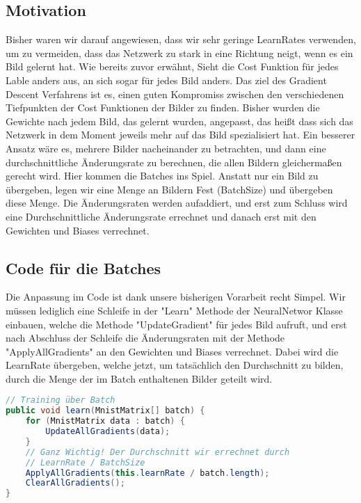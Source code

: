 \documentclass[12pt]{article}
\begin{document}
\subsection{ Motivation}
Bisher waren wir darauf angewiesen, dass wir sehr geringe LearnRates verwenden, um zu vermeiden, dass das Netzwerk zu stark in eine Richtung neigt, wenn es ein Bild gelernt hat. Wie bereits zuvor erwähnt, Sieht die Cost Funktion für jedes Lable anders aus, an sich sogar für jedes Bild anders. Das ziel des Gradient Descent Verfahrens ist es, einen guten Kompromiss zwischen den verschiedenen Tiefpunkten der Cost Funktionen der Bilder zu finden.
Bisher wurden die Gewichte nach jedem Bild, das gelernt wurden, angepasst, das heißt dass sich das Netzwerk in dem Moment jeweils mehr auf das Bild spezialisiert hat. Ein besserer Ansatz wäre es, mehrere Bilder nacheinander zu betrachten, und dann eine durchschnittliche Änderungsrate zu berechnen, die allen Bildern gleichermaßen gerecht wird. Hier kommen die Batches ins Spiel.
Anstatt nur ein Bild zu übergeben, legen wir eine Menge an Bildern Fest (BatchSize) und übergeben diese Menge. Die Änderungsraten werden aufaddiert, und erst zum Schluss wird eine Durchschnittliche Änderungsrate errechnet und danach erst mit den Gewichten und Biases verrechnet.
\subsection{ Code für die Batches}
Die Anpassung im Code ist dank unsere bisherigen Vorarbeit recht Simpel.
Wir müssen lediglich eine Schleife in der "Learn" Methode der NeuralNetwor Klasse einbauen, welche die Methode "UpdateGradient" für jedes Bild aufruft, und erst nach Abschluss der Schleife die Änderungsraten mit der Methode "ApplyAllGradients" an den Gewichten und Biases verrechnet. Dabei wird die LearnRate übergeben, welche jetzt, um tatsächlich den Durchschnitt zu bilden, durch die Menge der im Batch enthaltenen Bilder geteilt wird.\begin{lstlisting}[language=Java]
// Training über Batch
public void learn(MnistMatrix[] batch) {
    for (MnistMatrix data : batch) {
        UpdateAllGradients(data);
    }
    // Ganz Wichtig! Der Durchschnitt wir errechnet durch
    // LearnRate / BatchSize
    ApplyAllGradients(this.learnRate / batch.length);
    ClearAllGradients();
}
\end{lstlisting}
\end{document}

